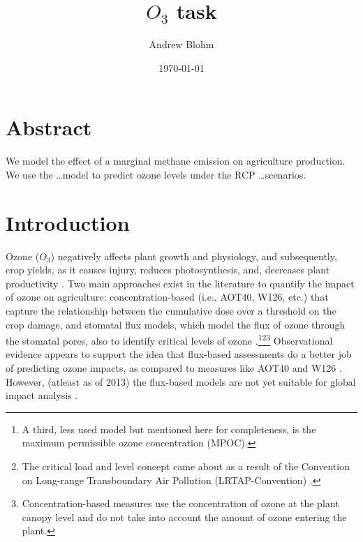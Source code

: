 \documentclass[10pt]{amsart}
\title{$O_{3}$ task}
\author{Andrew Blohm}
\date{\today}
\begin{document}
\maketitle

\section{Abstract}
We model the effect of a marginal methane emission on agriculture production.
We use the \ldots model to predict ozone levels under the RCP \ldots scenarios.


\section{Introduction}
Ozone ($O_{3}$) negatively affects plant growth and physiology, and subsequently, crop yields, as it causes injury, reduces photosynthesis, and, decreases plant productivity \parencite{mishra:2013aa}. 
Two main approaches exist in the literature to quantify the impact of ozone on agriculture: concentration-based (i.e., AOT40, W126, etc.) that capture the relationship between the cumulative dose over a threshold on the crop damage, and stomatal flux models, which model the flux of ozone through the stomatal pores, also to identify critical levels of ozone \parencite{mills:2007aa}.\footnote{A third, less used model but mentioned here for completeness, is the maximum permissible ozone concentration (MPOC)\parencite{mills:2007aa}.}\footnote{The critical load and level concept came about as a result of the Convention on Long-range Transboundary Air Pollution (LRTAP-Convention) \parencite{clrtap:2015aa}.}\footnote{Concentration-based measures use the concentration of ozone at the plant canopy level and do not take into account the amount of ozone entering the plant.}
Observational evidence appears to support the idea that flux-based assessments do a better job of predicting ozone impacts, as compared to measures like AOT40 and W126 \parencite{Avnery2013}.
However, (atleast as of 2013) the flux-based models are not yet suitable for global impact analysis \parencite{Avnery2013}.
\end{document}

